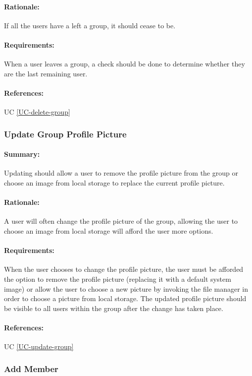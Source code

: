\documentclass[11pt]{article}
\begin{document}
\paragraph{Rationale:} If all the users have a left a group, it should cease to be.
\paragraph{Requirements:} When a user leaves a group, a check should be done to determine whether they are the last remaining user.
\paragraph{References:} UC \ref{UC-delete-group}

\subsubsection{Update Group Profile Picture} \label{FR-update-group-picture}
\paragraph{Summary:}
Updating should allow a user to remove the profile picture from the group or choose an image from local storage to replace the current profile picture.
\paragraph{Rationale:}
A user will often change the profile picture of the group, allowing the user to choose an image from local storage will afford the user more options.
\paragraph{Requirements:}
When the user chooses to change the profile picture, the user must be afforded the option to remove the profile picture (replacing it with a default system image) or allow the user to choose a new picture by invoking the file manager in order to choose a picture from local storage. The updated profile picture should be visible to all users within the group after the change has taken place.
\paragraph{References:} UC \ref{UC-update-group}

\subsubsection{Add Member} \label{FR-add-member}
\end{document}
